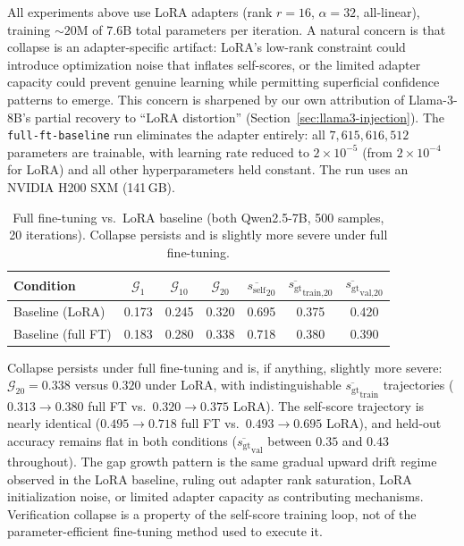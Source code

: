 \documentclass{article}
\newcommand{\gap}{\mathcal{G}}          %
\newcommand{\self}{s_{\text{self}}}     %
\newcommand{\gt}{s_{\text{gt}}}         %
\begin{document}
All experiments above use LoRA adapters (rank $r{=}16$, $\alpha{=}32$, all-linear),
training ${\sim}20$M of $7.6$B total parameters per iteration.
A natural concern is that collapse is an adapter-specific artifact: LoRA's low-rank
constraint could introduce optimization noise that inflates self-scores, or the
limited adapter capacity could prevent genuine learning while permitting superficial
confidence patterns to emerge.
This concern is sharpened by our own attribution of Llama-3-8B's partial recovery to
``LoRA distortion'' (Section~\ref{sec:llama3-injection}).
The \texttt{full-ft-baseline} run eliminates the adapter entirely: all $7{,}615{,}616{,}512$
parameters are trainable, with learning rate reduced to $2 \times 10^{-5}$ (from
$2 \times 10^{-4}$ for LoRA) and all other hyperparameters held constant.
The run uses an NVIDIA H200 SXM (141\,GB).

\begin{table}[h]
\centering
\caption{Full fine-tuning vs.\ LoRA baseline (both Qwen2.5-7B, 500 samples, 20 iterations).
Collapse persists and is slightly more severe under full fine-tuning.}
\label{tab:full-ft}
\small
\begin{tabular}{lcccccc}
\toprule
Condition & $\gap_1$ & $\gap_{10}$ & $\gap_{20}$ & $\overline{\self}_{20}$ & $\overline{\gt}_\text{train,20}$ & $\overline{\gt}_\text{val,20}$ \\
\midrule
Baseline (LoRA)    & 0.173 & 0.245 & 0.320 & 0.695 & 0.375 & 0.420 \\
Baseline (full FT) & 0.183 & 0.280 & 0.338 & 0.718 & 0.380 & 0.390 \\
\bottomrule
\end{tabular}
\end{table}

Collapse persists under full fine-tuning and is, if anything, slightly more severe:
$\gap_{20} = 0.338$ versus $0.320$ under LoRA, with indistinguishable
$\overline{\gt}_\text{train}$ trajectories ($0.313 \to 0.380$ full FT vs.\
$0.320 \to 0.375$ LoRA).
The self-score trajectory is nearly identical ($0.495 \to 0.718$ full FT vs.\
$0.493 \to 0.695$ LoRA), and held-out accuracy remains flat in both conditions
($\overline{\gt}_\text{val}$ between $0.35$ and $0.43$ throughout).
The gap growth pattern is the same gradual upward drift regime observed in the LoRA
baseline, ruling out adapter rank saturation, LoRA initialization noise, or
limited adapter capacity as contributing mechanisms.
Verification collapse is a property of the self-score training loop, not of the
parameter-efficient fine-tuning method used to execute it.
\end{document}
